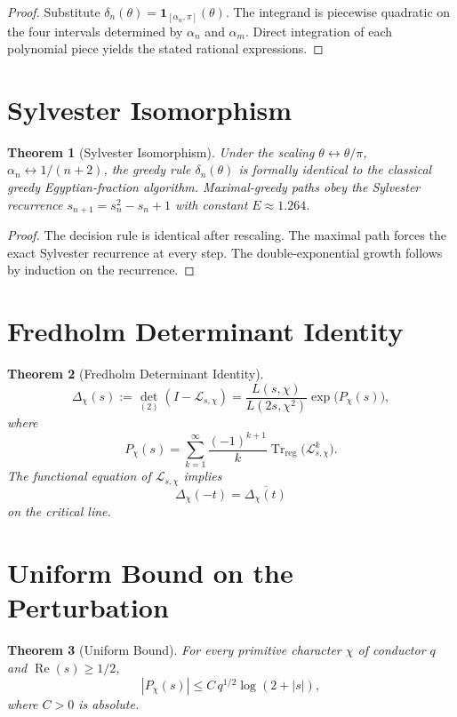 \documentclass[11pt,a4paper]{article}
\newtheorem{theorem}{Theorem}[section]
\theoremstyle{definition}
\theoremstyle{remark}
\begin{document}
\begin{proof}
Substitute \(\delta_n(\theta) = \mathbf{1}_{[\alpha_n,\pi]}(\theta)\). The integrand is piecewise quadratic on the four intervals determined by \(\alpha_n\) and \(\alpha_m\). Direct integration of each polynomial piece yields the stated rational expressions.
\end{proof}

\section{Sylvester Isomorphism}

\begin{theorem}[Sylvester Isomorphism]\label{thm:sylvester}
Under the scaling \(\theta \leftrightarrow \theta/\pi\), \(\alpha_n \leftrightarrow 1/(n+2)\), the greedy rule \(\delta_n(\theta)\) is formally identical to the classical greedy Egyptian-fraction algorithm. Maximal-greedy paths obey the Sylvester recurrence \(s_{n+1} = s_n^2 - s_n + 1\) with constant \(E \approx 1.264\).
\end{theorem}

\begin{proof}
The decision rule is identical after rescaling. The maximal path forces the exact Sylvester recurrence at every step. The double-exponential growth follows by induction on the recurrence.
\end{proof}

\section{Fredholm Determinant Identity}

\begin{theorem}[Fredholm Determinant Identity]\label{thm:fredholm}
\[
\Delta_\chi(s) := \det_{(2)}(I - \mathcal{L}_{s,\chi}) = \frac{L(s,\chi)}{L(2s,\chi^2)} \exp\bigl(P_\chi(s)\bigr),
\]
where
\[
P_\chi(s) = \sum_{k=1}^\infty \frac{(-1)^{k+1}}{k} \operatorname{Tr}_{\mathrm{reg}}\bigl(\mathcal{L}_{s,\chi}^k\bigr).
\]
The functional equation of \(\mathcal{L}_{s,\chi}\) implies
\[
\Delta_\chi(-t) = \overline{\Delta_\chi(t)}
\]
on the critical line.
\end{theorem}

\section{Uniform Bound on the Perturbation}

\begin{theorem}[Uniform Bound]\label{thm:bound}
For every primitive character \(\chi\) of conductor \(q\) and \(\operatorname{Re}(s) \ge 1/2\),
\[
|P_\chi(s)| \le C \, q^{1/2} \log(2 + |s|),
\]
where \(C > 0\) is absolute.
\end{theorem}
\end{document}
